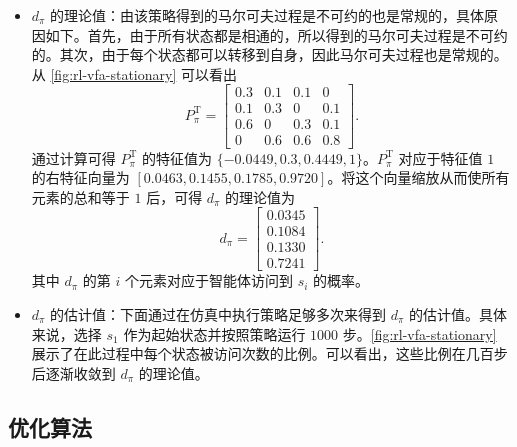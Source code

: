 \begin{note}[方框 8.1：马尔可夫决策过程的平稳分布]
\begin{itemize}
  \item $d_{\pi}$ 的理论值：由该策略得到的马尔可夫过程是不可约的也是常规的，具体原因如下。首先，由于所有状态都是相通的，所以得到的马尔可夫过程是不可约的。其次，由于每个状态都可以转移到自身，因此马尔可夫过程也是常规的。从 \cref{fig:rl-vfa-stationary} 可以看出
  \begin{equation*}
  P_{\pi}^{\mathrm{T}} = \left[\begin{array}{cccc} 0.3 & 0.1 & 0.1 & 0 \\ 0.1 & 0.3 & 0 & 0.1 \\ 0.6 & 0 & 0.3 & 0.1 \\ 0 & 0.6 & 0.6 & 0.8 \end{array}\right].
  \end{equation*}
  通过计算可得 $P_{\pi}^{\mathrm{T}}$ 的特征值为 $\{-0.0449, 0.3, 0.4449, 1\}$。$P_{\pi}^{\mathrm{T}}$ 对应于特征值 $1$ 的右特征向量为 $[0.0463, 0.1455, 0.1785, 0.9720]$。将这个向量缩放从而使所有元素的总和等于 $1$ 后，可得 $d_{\pi}$ 的理论值为
  \begin{equation*}
  d_{\pi} = \left[\begin{array}{l} 0.0345 \\ 0.1084 \\ 0.1330 \\ 0.7241 \end{array}\right].
  \end{equation*}
  其中 $d_{\pi}$ 的第 $i$ 个元素对应于智能体访问到 $s_i$ 的概率。
  \item $d_{\pi}$ 的估计值：下面通过在仿真中执行策略足够多次来得到 $d_{\pi}$ 的估计值。具体来说，选择 $s_1$ 作为起始状态并按照策略运行 $1000$ 步。\cref{fig:rl-vfa-stationary} 展示了在此过程中每个状态被访问次数的比例。可以看出，这些比例在几百步后逐渐收敛到 $d_{\pi}$ 的理论值。
\end{itemize}
\end{note}

\subsection{优化算法}
\label{sec:rl-vfa-optalg}


